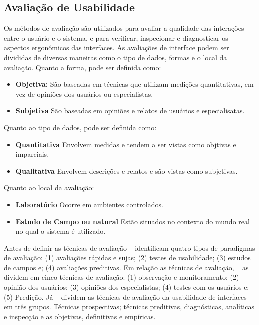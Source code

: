 \subsection {Avaliação de Usabilidade}

Os métodos de avaliação são utilizados para avaliar a qualidade das interações entre o usuário e o sistema, e para verificar, inspecionar e diagnosticar os aspectos ergonômicos das interfaces.
%
As avaliações de interface podem ser divididas de diversas maneiras como o tipo de dados, formas e o local da avaliação. Quanto a forma, pode ser definida como:

	\begin{itemize}
		\item \textbf{Objetiva:} São baseadas em técnicas que utilizam medições quantitativas, em vez de opiniões dos usuários ou especialistas.
		\item \textbf{Subjetiva} São baseadas em opiniões e relatos de usuários e especialisatas.
	\end{itemize}

	Quanto ao tipo de dados, pode ser definida como:

	\begin{itemize}
		\item \textbf{Quantitativa} Envolvem medidas e tendem a ser vistas como objtivas e imparciais.
		\item \textbf{Qualitativa} Envolvem descrições e relatos e são vistas como subjetivas.
	\end{itemize}

	Quanto ao local da avaliação:

	\begin{itemize}
		\item \textbf{Laboratório} Ocorre em ambientes controlados.
		\item \textbf{Estudo de Campo ou natural} Estão situados no contexto do mundo real no qual o sistema é utilizado.
	\end{itemize}

	 
Antes de definir as técnicas de avaliação ~ identificam quatro tipos de paradigmas de avaliação: (1) avaliações rápidas e sujas; (2) testes de usabilidade; (3) estudos de campos e; (4) avaliações preditivas.
%
Em relação as técnicas de avaliação, ~ as dividem em cinco técnicas de avaliação: (1) observação e monitoramento; (2) opinião dos usuários; (3) opiniões dos especialistas; (4) testes com os usuários e; (5) Predição. 
%
Já ~ dividem as técnicas de avaliação da usabilidade de interfaces em três grupos. Técnicas prospectivas; técnicas preditivas, diagnósticas, analíticas e inspecção e as objetivas, definitivas e empíricas.


